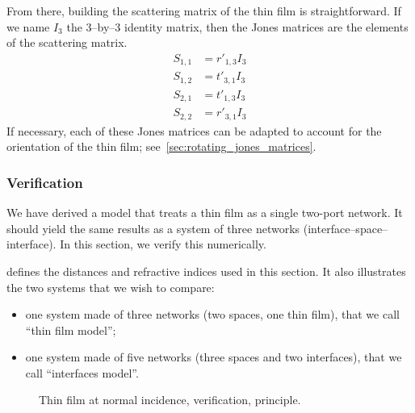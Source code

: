 From there, building the scattering matrix of the thin film is straightforward.
If we name $I_3$ the 3--by--3 identity matrix,
then the Jones matrices  
are the elements of the scattering matrix.
\begin{subequations}
    \begin{align}
        S_{1, 1} &= r'_{1, 3} I_3 \label{eq:thin_film_normal_s11} \\
        S_{1, 2} &= t'_{3, 1} I_3 \label{eq:thin_film_normal_s12} \\
        S_{2, 1} &= t'_{1, 3} I_3 \label{eq:thin_film_normal_s21} \\
        S_{2, 2} &= r'_{3, 1} I_3 \label{eq:thin_film_normal_s22}
    \end{align}
    \label{eq:thin_film_normal_sij}
\end{subequations}
If necessary, each of these Jones matrices can be adapted to account for the orientation of the thin film;
see~\vref{sec:rotating_jones_matrices}.

\subsubsection{Verification}
We have derived a model that treats a thin film as a single two-port network.
It should yield the same results as a system of three networks
(interface--space--interface).
In this section, we verify this numerically.

 defines the distances and refractive indices used in this section.
It also illustrates the two systems that we wish to compare:
\begin{itemize}
    \item one system made of three networks (two spaces, one thin film), that we call ``thin film model'';
    \item one system made of five networks (three spaces and two interfaces), that we call ``interfaces model''.
\end{itemize}
\begin{figure}[hbtp]
    \centering
    
    \caption{Thin film at normal incidence, verification, principle.}
    \label{fig:thin_film_normal_verification_principle}
\end{figure}


